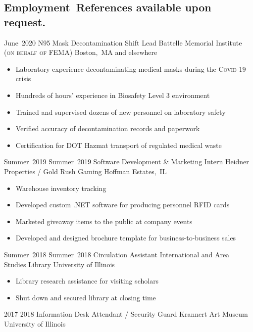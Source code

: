 \subsection*{Employment\hfill\ {\footnotesize References available upon request.}}
\secitemexperience
	{June~2020}
	{}
	{N95 Mask Decontamination Shift Lead}
	{Battelle Memorial Institute {\scshape\footnotesize (on behalf of FEMA)}}
	{Boston,~MA \footnotesize and elsewhere}
	{
		\begin{itemize}
			\vspace{-2mm}
			\item Laboratory experience decontaminating medical masks during the {\scshape Covid-19} crisis
			\item Hundreds of hours' experience in Biosafety Level 3 environment
			\item Trained and supervised dozens of new personnel on laboratory safety
			\item Verified accuracy of decontamination records and paperwork
			\item Certification for DOT Hazmat transport of regulated medical waste
			\vspace{-2mm}
		\end{itemize}
	}
\secitemexperience
	{Summer~2019}
	{Summer~2019}
	{Software Development \& Marketing Intern}
	{Heidner Properties / Gold Rush Gaming}
	{Hoffman Estates,~IL}
	{
		\begin{itemize}
			\vspace{-2mm}
			\item Warehouse inventory tracking
			\item Developed custom .NET software for producing personnel RFID cards
			\item Marketed giveaway items to the public at company events
			\item Developed and designed brochure template for business-to-business sales
			\vspace{-2mm}
		\end{itemize}
	}
\secitemexperience
	{Summer~2018}
	{Summer~2018}
	{Circulation Assistant}
	{International and Area Studies Library}
	{University of Illinois}
	{
		\begin{itemize}
			\vspace{-2mm}
			\item Library research assistance for visiting scholars
			\item Shut down and secured library at closing time
			\vspace{-2mm}
		\end{itemize}
	}
\secitemexperience
	{2017}
	{2018}
	{Information Desk Attendant / Security Guard}
	{Krannert Art Museum}
	{University of Illinois}
    {%
    }
	
